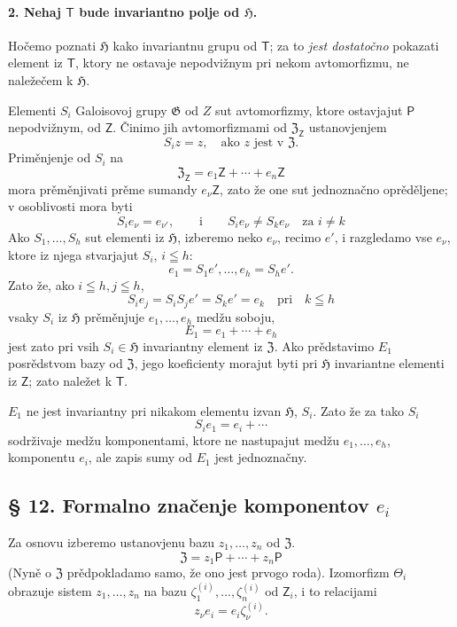 \documentclass[11pt]{article}
\begin{document}
\paragraph{2. Nehaj \(\mathsf T\) bude invariantno polje od \(\mathfrak H\).}
Hočemo poznati \(\mathfrak H\) kako invariantnu grupu od \(\mathsf T\); za to \emph{jest dostatočno} pokazati element iz \(\mathsf T\), ktory ne ostavaje nepodvižnym pri nekom avtomorfizmu, ne naležečem k \(\mathfrak H\).

Elementi \(S_i\) Galoisovoj grupy \(\mathfrak G\) od \(Z\) sut avtomorfizmy, ktore ostavjajut \(\mathsf P\) nepodvižnym, od \(\mathsf Z\). Činimo jih avtomorfizmami od \(\mathfrak Z_{\mathsf Z}\) ustanovjenjem
\[
S_i z=z,\quad \text{ako } z \text{ jest v } \mathfrak Z.
\]
Priměnjenje od \(S_i\) na
\[
\mathfrak Z_{\mathsf Z}=e_1\mathsf Z+\cdots+e_n\mathsf Z
\]
mora prěměnjivati prěme sumandy \(e_\nu\mathsf Z\), zato že one sut jednoznačno oprěděljene; v osoblivosti mora byti
\[
S_i e_\nu=e_{\nu'},\qquad\text{i}\qquad S_i e_\nu\ne S_k e_\nu
\quad\text{za } i\ne k
\]
Ako \(S_1,\ldots,S_h\) sut elementi iz \(\mathfrak H\), izberemo neko \(e_\nu\), recimo \(e'\), i razgledamo vse \(e_\nu\), ktore iz njega stvarjajut \(S_i\), \(i\leqq h\):
\[
e_1=S_1e',\ldots,e_h=S_he'.
\]
Zato že, ako \(i\leqq h, j\leqq h\),
\[
S_i e_j=S_iS_j e'=S_ke'=e_k \quad \text{pri}\quad k\leqq h
\]
vsaky \(S_i\) iz \(\mathfrak H\) prěměnjuje \(e_1,\ldots,e_h\) medžu soboju,
\[
E_1=e_1+\cdots+e_h
\]
jest zato pri vsih \(S_i\in\mathfrak H\) invariantny element iz \(\mathfrak Z\). Ako prědstavimo \(E_1\) posrědstvom bazy od \(\mathfrak Z\), jego koeficienty morajut byti pri \(\mathfrak H\) invariantne elementi iz \(\mathsf Z\); zato naležet k \(\mathsf T\).

\(E_1\) ne jest invariantny pri nikakom elementu izvan \(\mathfrak H\), \(S_i\). Zato že za tako \(S_i\)
\[
S_i e_1=e_i+\cdots
\]
sodrživaje medžu komponentami, ktore ne nastupajut medžu \(e_1,\ldots,e_h\), komponentu \(e_i\), ale zapis sumy od \(E_1\) jest jednoznačny.

\subsection*{§ 12. Formalno značenje komponentov \(e_i\)}\label{die-formale-bedeutung-der-komponenten-ei}

Za osnovu izberemo ustanovjenu bazu \(z_1,\ldots,z_n\) od \(\mathfrak Z\).
\[
\mathfrak Z=z_1\mathsf P+\cdots+z_n\mathsf P
\]
(Nyně o \(\mathfrak Z\) prědpokladamo samo, že ono jest prvogo roda). Izomorfizm \(\Theta_i\) obrazuje sistem \(z_1,\ldots,z_n\) na bazu \(\zeta_1^{(i)},\ldots,\zeta_n^{(i)}\) od \(\mathsf Z_i\), i to relacijami
\[
z_\nu e_i=e_i\zeta_\nu^{(i)} .
\]
\end{document}
